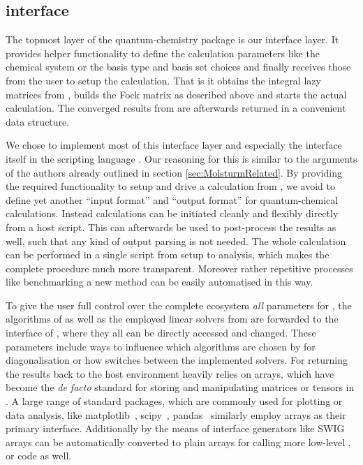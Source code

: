 \subsection{\molsturm \python interface}
\label{sec:MolsturmPython}

The topmost layer of the \molsturm quantum-chemistry
package is our interface layer.
It provides helper functionality to
define the calculation parameters like the chemical system
or the basis type and basis set choices
and finally receives those from the user
to setup the calculation.
That is it obtains the integral lazy matrices
from \gint, builds the Fock matrix
as described above and starts the actual \SCF calculation.
The converged results from \gscf are afterwards
returned in a convenient data structure.

We chose to implement most of this interface layer
and especially the interface itself
in the scripting language \python.
Our reasoning for this is similar to the arguments
of the \pyscf authors already outlined in section \ref{sec:MolsturmRelated}.
By providing the required functionality to setup and drive
a \molsturm calculation from \python,
we avoid to define yet another ``input format'' and ``output format''
for quantum-chemical calculations.
Instead calculations can be initiated cleanly and flexibly
directly from a host script.
This can afterwards be used to post-process the results as well,
such that any kind of output parsing is not needed.
The whole calculation can be performed in a single script
from setup to analysis,
which makes the complete procedure much more transparent.
Moreover rather repetitive processes like
benchmarking a new method
can be easily automatised in this way.

To give the user full control over the complete \molsturm ecosystem
\emph{all} parameters for \gint, the \SCF algorithms of \gscf
as well as the employed linear solvers from \lazyten are forwarded
to the \python interface of \molsturm,
where they all can be directly accessed and changed.
These parameters include ways to influence which algorithms are
chosen by \lazyten for diagonalisation
or how \gint switches between the implemented \SCF solvers.
For returning the \SCF results back to the host environment \molsturm
heavily relies on \numpy arrays,
which have become the \textit{de facto} standard
for storing and manipulating matrices or tensors in \python.
A large range of standard \python packages,
which are commonly used for plotting or data analysis,
like matplotlib~, scipy~\cite{Walt2011,scipyWeb}, pandas~
similarly employ \numpy arrays as their primary interface.
Additionally by the means of interface generators like SWIG~
\numpy arrays can be automatically converted to plain
\ccc arrays for calling more low-level \cpp, \ccc or \fortran code as well.

